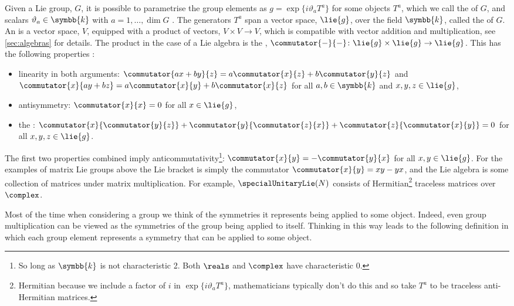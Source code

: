 \documentclass[fleqn]{NotesClass}
\renewcommand{\field}{\symbb{k}}
\begin{document}
    Given a Lie group, \(G\), it is possible to parametrise the group elements as \(g = \exp\{i\vartheta_aT^a\}\) for some objects \(T^a\), which we call the  of \(G\), and scalars \(\vartheta_a \in \field\) with \(a = 1, \dotsc, \dim G\) \cite[98]{san-martin-lie-groups}.
    The generators \(T^a\) span a vector space, \(\lie{g}\), over the field \(\field\), called the  of \(G\).
    An  is a vector space, \(V\), equipped with a product of vectors, \(V \times V \to V\), which is compatible with vector addition and multiplication, see \cref{sec:algebras} for details.
    The product in the case of a Lie algebra is the , \(\commutator{-}{-} \colon \lie{g} \times \lie{g} \to \lie{g}\).
    This has the following properties \cite[92]{san-martin-lie-groups}:
    \begin{itemize}
        \item linearity in both arguments: \(\commutator{ax + by}{z} = a\commutator{x}{z} + b\commutator{y}{z}\) and \(\commutator{x}{ay + bz} = a\commutator{x}{y} + b\commutator{x}{z}\) for all \(a, b \in \field\) and \(x, y, z \in \lie{g}\),
        \item antisymmetry: \(\commutator{x}{x} = 0\) for all \(x \in \lie{g}\),
        \item the : \(\commutator{x}{\commutator{y}{z}} + \commutator{y}{\commutator{z}{x}} + \commutator{z}{\commutator{x}{y}} = 0\) for all \(x, y, z \in \lie{g}\).
    \end{itemize}
    The first two properties combined imply anticommutativity\footnote{So long as \(\field\) is not characteristic 2. Both \(\reals\) and \(\complex\) have characteristic 0.}: \(\commutator{x}{y} = -\commutator{y}{x}\) for all \(x, y \in \lie{g}\).
    For the examples of matrix Lie groups above the Lie bracket is simply the commutator \(\commutator{x}{y} = xy - yx\), and the Lie algebra is some collection of matrices under matrix multiplication.
    For example, \(\specialUnitaryLie(N)\) consists of Hermitian\footnote{Hermitian because we include a factor of \(i\) in \(\exp\{i\vartheta_a T^a\}\), mathematicians typically don't do this and so take \(T^a\) to be traceless anti-Hermitian matrices.} traceless matrices over \(\complex\).
    
    Most of the time when considering a group we think of the symmetries it represents being applied to some object.
    Indeed, even group multiplication can be viewed as the symmetries of the group being applied to itself.
    Thinking in this way leads to the following definition in which each group element represents a symmetry that can be applied to some object.
    
\end{document}
